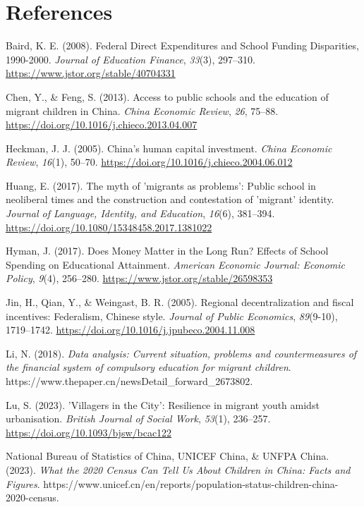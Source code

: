 \documentclass[
  man,
  floatsintext,
  longtable,
  nolmodern,
  notxfonts,
  notimes,
  colorlinks=true,linkcolor=blue,citecolor=blue,urlcolor=blue]{apa7}
\newlength{\cslhangindent}
\newenvironment{CSLReferences}[2] %
 {\begin{list}{}{%
  \setlength{\itemindent}{0pt}
  \setlength{\leftmargin}{0pt}
  \setlength{\parsep}{0pt}
  \ifodd #1
   \setlength{\leftmargin}{\cslhangindent}
   \setlength{\itemindent}{-1\cslhangindent}
  \fi
  \setlength{\itemsep}{#2\baselineskip}}}
 {\end{list}}
\begin{document}
\clearpage

\section{References}\label{references}

\label{refs}
\begin{CSLReferences}{1}{0}
Baird, K. E. (2008). Federal {Direct Expenditures} and {School Funding
Disparities}, 1990-2000. \emph{Journal of Education Finance},
\emph{33}(3), 297--310. \url{https://www.jstor.org/stable/40704331}

Chen, Y., \& Feng, S. (2013). Access to public schools and the education
of migrant children in {China}. \emph{China Economic Review}, \emph{26},
75--88. \url{https://doi.org/10.1016/j.chieco.2013.04.007}

Heckman, J. J. (2005). China's human capital investment. \emph{China
Economic Review}, \emph{16}(1), 50--70.
\url{https://doi.org/10.1016/j.chieco.2004.06.012}

Huang, E. (2017). The myth of 'migrants as problems': {Public} school in
neoliberal times and the construction and contestation of 'migrant'
identity. \emph{Journal of Language, Identity, and Education},
\emph{16}(6), 381--394.
\url{https://doi.org/10.1080/15348458.2017.1381022}

Hyman, J. (2017). Does {Money Matter} in the {Long Run}? {Effects} of
{School Spending} on {Educational Attainment}. \emph{American Economic
Journal: Economic Policy}, \emph{9}(4), 256--280.
\url{https://www.jstor.org/stable/26598353}

Jin, H., Qian, Y., \& Weingast, B. R. (2005). Regional decentralization
and fiscal incentives: {Federalism}, {Chinese} style. \emph{Journal of
Public Economics}, \emph{89}(9-10), 1719--1742.
\url{https://doi.org/10.1016/j.jpubeco.2004.11.008}

Li, N. (2018). \emph{{Data analysis: Current situation, problems and
countermeasures of the financial system of compulsory education for
migrant children}}.
https://www.thepaper.cn/newsDetail\_forward\_2673802.

Lu, S. (2023). '{Villagers} in the {City}': {Resilience} in migrant
youth amidst urbanisation. \emph{British Journal of Social Work},
\emph{53}(1), 236--257. \url{https://doi.org/10.1093/bjsw/bcac122}

National Bureau of Statistics of China, UNICEF China, \& UNFPA China.
(2023). \emph{What the 2020 {Census Can Tell Us About Children} in
{China}: {Facts} and {Figures}}.
https://www.unicef.cn/en/reports/population-status-children-china-2020-census.

\end{CSLReferences}
\end{document}
